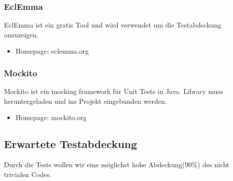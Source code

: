\documentclass[a4,12pt]{scrartcl}
\begin{document}
\subsubsection{EclEmma}
EclEmma ist ein gratis Tool und wird verwendet um die Testabdeckung anzuzeigen. 
\begin{itemize}
\item Homepage: eclemma.org
\end{itemize}
\subsubsection{Mockito}
Mockito ist ein mocking framework für Unit Tests in Java. Library muss heruntergeladen und ins Projekt eingebunden werden. 
\begin{itemize}
\item Homepage: mockito.org
\end{itemize}
\newpage

\subsection{Erwartete Testabdeckung}
Durch die Tests wollen wir eine möglichst hohe Abdeckung(90\%) des nicht trivialen Codes.
\end{document}
